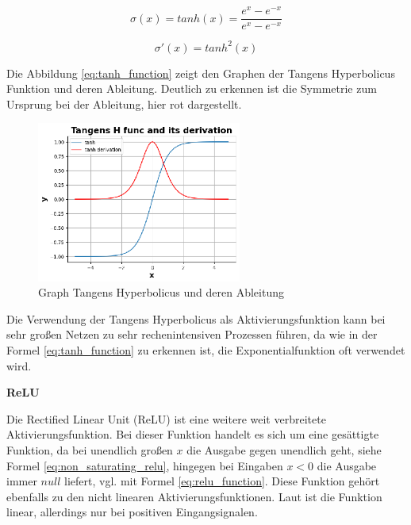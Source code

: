 \begin{equation}\label{eq:tanh_function}
	\sigma (x) = tanh(x) = \frac{e^{x} - e^{-x}}{e^{x} - e^{-x}}
\end{equation}

\begin{equation}\label{eq:derivative_tanh_function}
	\sigma' (x) = tanh^2(x)
\end{equation}

Die Abbildung \ref{eq:tanh_function} zeigt den Graphen der Tangens Hyperbolicus Funktion und deren Ableitung. Deutlich zu erkennen ist die Symmetrie zum Ursprung bei der Ableitung, hier rot dargestellt.

\begin{figure}[!ht]
	\includegraphics[width=0.6\textwidth]{content/chapter_basics/plots/tanh_func_plot.eps}
	\centering
	\caption{Graph Tangens Hyperbolicus und deren Ableitung}
	\label{img:tanh_func_graph}
\end{figure}

Die Verwendung der Tangens Hyperbolicus als Aktivierungsfunktion kann bei sehr großen Netzen zu sehr rechenintensiven Prozessen führen, da wie in der Formel \ref{eq:tanh_function} zu erkennen ist, die Exponentialfunktion oft verwendet wird.\vspace{0.2cm}

%
\textbf{ReLU}\vspace{0.2cm}


Die Rectified Linear Unit (ReLU) ist eine weitere weit verbreitete Aktivierungsfunktion. Bei dieser Funktion handelt es sich um eine gesättigte Funktion, da bei unendlich großen $x$ die Ausgabe gegen unendlich geht, siehe Formel \ref{eq:non_saturating_relu}, hingegen bei Eingaben $x < 0$ die Ausgabe immer $null$ liefert, vgl. mit Formel \ref{eq:relu_function}. Diese Funktion gehört ebenfalls zu den nicht linearen Aktivierungsfunktionen. Laut \cite{yuen_universal_2021} ist die Funktion linear, allerdings nur bei positiven Eingangsignalen.\vspace{0.2cm}

